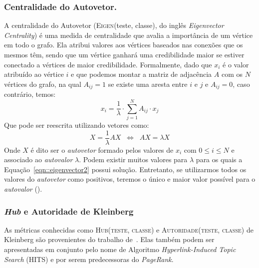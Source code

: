 \subsubsection{Centralidade do Autovetor.}
\label{subsubsection::eigenvector}

A centralidade do Autovetor (\textsc{Eigen}(teste, classe), do inglês \textit{Eigenvector Centrality}) é uma medida de centralidade que avalia a importância de um vértice em todo o grafo. Ela atribui valores aos vértices baseados nas conexões que os mesmos têm, sendo que um vértice ganhará uma credibilidade maior se estiver conectado a vértices de maior credibilidade. Formalmente, dado que $x_i$ é o valor atribuído ao vértice $i$ e que podemos montar a matriz de adjacência $A$ com os $N$ vértices do grafo, na qual $A_{ij} = 1$ se existe uma aresta entre $i$ e $j$ e $A_{ij}=0$, caso contrário, temos:
\begin{equation}\label{eqn::eigenvector1}
   x_i = \frac{1}{\lambda} \cdot \sum\limits_{j=1}^{N} A_{ij} \cdot x_j
\end{equation}
Que pode ser reescrita utilizando vetores como:
\begin{equation}\label{eqn::eigenvector2}
   X = \frac{1}{\lambda} AX  \;\; \Longleftrightarrow\;\;  AX = \lambda X
\end{equation}
Onde $X$ é dito ser o \textit{autovetor} formado pelos valores de $x_i$ com $0 \leq i \leq N$ e associado ao \textit{autovalor} $\lambda$.  Podem existir muitos valores para $\lambda$ para os quais a Equação~\ref{eqn::eigenvector2} possui solução. Entretanto, se utilizarmos todos os valores do \textit{autovetor} como positivos, teremos o único e maior valor possível para o \textit{autovalor} (\cite{Newman10}). 

\subsubsection{\textit{Hub} e Autoridade de Kleinberg}
\label{subsubsection::hub}
As métricas conhecidas como \textsc{Hub(teste, classe)} e \textsc{Autoridade(teste, classe)} de Kleinberg são provenientes do trabalho de~\cite{Kleinberg99}. Elas também podem ser apresentadas em conjunto pelo nome de Algoritmo \textit{Hyperlink-Induced Topic Search} (HITS) e por serem predecessoras do \textit{PageRank}.

